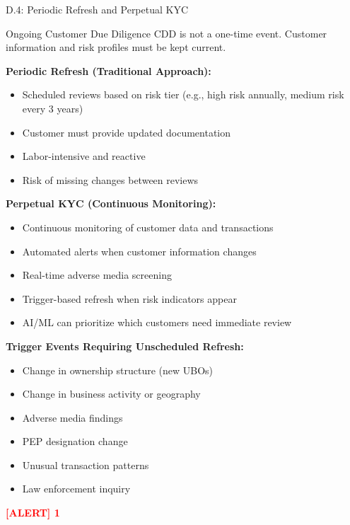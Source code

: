 \documentclass[11pt,a4paper]{beamer}
\newcommand{\redflag}[1]{\textcolor{red}{\textbf{[ALERT] 1}}}
\begin{document}
\begin{frame}{D.4: Periodic Refresh and Perpetual KYC}
	\begin{block}{Ongoing Customer Due Diligence}
		CDD is not a one-time event. Customer information and risk profiles must be kept current.
	\end{block}
	\textbf{Periodic Refresh (Traditional Approach):}
	\begin{itemize}
		\item Scheduled reviews based on risk tier (e.g., high risk annually, medium risk every 3 years)
		\item Customer must provide updated documentation
		\item Labor-intensive and reactive
		\item Risk of missing changes between reviews
	\end{itemize}
	\textbf{Perpetual KYC (Continuous Monitoring):}
	\begin{itemize}
		\item Continuous monitoring of customer data and transactions
		\item Automated alerts when customer information changes
		\item Real-time adverse media screening
		\item Trigger-based refresh when risk indicators appear
		\item AI/ML can prioritize which customers need immediate review
	\end{itemize}
	\textbf{Trigger Events Requiring Unscheduled Refresh:}
	\begin{itemize}
		\item Change in ownership structure (new UBOs)
		\item Change in business activity or geography
		\item Adverse media findings
		\item PEP designation change
		\item Unusual transaction patterns
		\item Law enforcement inquiry
	\end{itemize}
	\redflag{Waiting for scheduled refresh after material changes is a control failure.}
\end{frame}
\end{document}
